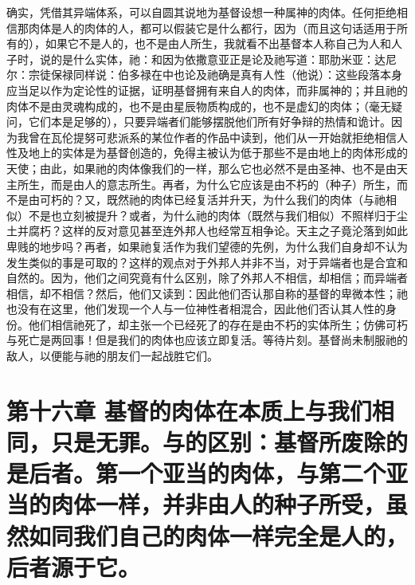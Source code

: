 确实，凭借其异端体系，可以自圆其说地为基督设想一种属神的肉体。任何拒绝相信那肉体是人的肉体的人，都可以假装它是什么都行，因为（而且这句话适用于所有的），如果它不是人的，也不是由人所生，我就看不出基督本人称自己为人和人子时，说的是什么实体，祂：和因为依撒意亚正是论及祂写道：耶肋米亚：达尼尔：宗徒保禄同样说：伯多禄在中也论及祂确是真有人性（他说）：这些段落本身应当足以作为定论性的证据，证明基督拥有来自人的肉体，而非属神的；并且祂的肉体不是由灵魂构成的，也不是由星辰物质构成的，也不是虚幻的肉体；（毫无疑问，它们本是足够的），只要异端者们能够摆脱他们所有好争辩的热情和诡计。因为我曾在瓦伦提努可悲派系的某位作者的作品中读到，他们从一开始就拒绝相信人性及地上的实体是为基督创造的，免得主被认为低于那些不是由地上的肉体形成的天使；由此，如果祂的肉体像我们的一样，那么它也必然不是由圣神、也不是由天主所生，而是由人的意志所生。再者，为什么它应该是由不朽的（种子）所生，而不是由可朽的？又，既然祂的肉体已经复活并升天，为什么我们的肉体（与祂相似）不是也立刻被提升？或者，为什么祂的肉体（既然与我们相似）不照样归于尘土并腐朽？这样的反对意见甚至连外邦人也经常互相争论。天主之子竟沦落到如此卑贱的地步吗？再者，如果祂复活作为我们望德的先例，为什么我们自身却不认为发生类似的事是可取的？这样的观点对于外邦人并非不当，对于异端者也是合宜和自然的。因为，他们之间究竟有什么区别，除了外邦人不相信，却相信；而异端者相信，却不相信？然后，他们又读到：因此他们否认那自称的基督的卑微本性；祂也没有在这里，他们发现一个人与一位神性者相混合，因此他们否认其人性的身份。他们相信祂死了，却主张一个已经死了的存在是由不朽的实体所生；仿佛可朽与死亡是两回事！但是我们的肉体也应该立即复活。等待片刻。基督尚未制服祂的敌人，以便能与祂的朋友们一起战胜它们。\par


\section{第十六章 基督的肉体在本质上与我们相同，只是无罪。与的区别：基督所废除的是后者。第一个亚当的肉体，与第二个亚当的肉体一样，并非由人的种子所受，虽然如同我们自己的肉体一样完全是人的，后者源于它。}

